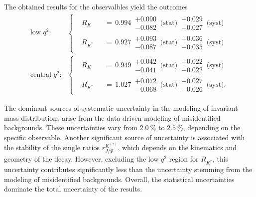The obtained results for the observalbles yield the outcomes
\begin{align*}
    \text{low $q^2$:} 
    &\left\{
    \begin{aligned}
        &R_{K}  \!\!\!\!\!\!\!&&=\, 0.994 \,\substack{+0.090 \\ -0.082}\,\text{(stat)}\,\substack{+0.029 \\ -0.027}\,\text{(syst)}\\
        &R_{K^*}\!\!\!\!\!\!\!&&=\, 0.927 \,\substack{+0.093 \\ -0.087}\,\text{(stat)}\,\substack{+0.036 \\ -0.035}\,\text{(syst)}
    \end{aligned}
    \right. \\
    \text{central $q^2$:} 
    &\left\{
    \begin{aligned}
        &R_{K}  \!\!\!\!\!\!\!&&=\, 0.949 \,\substack{+0.042 \\ -0.041}\,\text{(stat)}\,\substack{+0.022 \\ -0.022}\,\text{(syst)}\\
        &R_{K^*}\!\!\!\!\!\!\!&&=\, 1.027 \,\substack{+0.072 \\ -0.068}\,\text{(stat)}\,\substack{+0.027 \\ -0.026}\,\text{(syst)}.
    \end{aligned}
    \right.
\end{align*}

The dominant sources of systematic uncertainty in the modeling of 
invariant mass distributions arise from the data-driven modeling 
of misidentified backgrounds. These uncertainties vary from 
$\SI{2.0}{\%}$ to $\SI{2.5}{\%}$, depending on the specific observable. 
Another significant source of uncertainty is associated with the 
stability of the single ratios $r^{K^{(*)}}_{J/\Psi}$, which depends on 
the kinematics and geometry of the decay. However, excluding the low 
$q^2$ region for $R_{K^*}$, this uncertainty contributes significantly 
less than the uncertainty stemming from the modeling of misidentified 
backgrounds. Overall, the statistical uncertainties dominate the total 
uncertainty of the results.